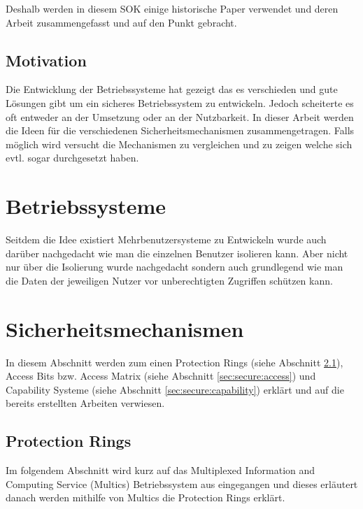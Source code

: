 \documentclass[11pt,technote]{IEEEtran}
\begin{document}
    Deshalb werden in diesem SOK einige historische Paper verwendet und deren Arbeit
    zusammengefasst und auf den Punkt gebracht.
    
    \subsection{Motivation}
      Die Entwicklung der Betriebssysteme hat gezeigt das es verschieden und gute L\"osungen gibt um ein sicheres Betriebssystem zu entwickeln.
      Jedoch scheiterte es oft entweder an der Umsetzung oder an der Nutzbarkeit. 
      In dieser Arbeit werden die Ideen f\"ur die verschiedenen Sicherheitsmechanismen zusammengetragen.
      Falls m\"oglich wird versucht die Mechanismen zu vergleichen und zu zeigen welche sich evtl. sogar durchgesetzt haben.
   \section{Betriebssysteme}
     Seitdem die Idee existiert Mehrbenutzersysteme zu Entwickeln wurde auch dar\"uber nachgedacht wie man die einzelnen Benutzer isolieren kann.
     Aber nicht nur \"uber die Isolierung wurde nachgedacht sondern auch grundlegend wie man die Daten 
     der jeweiligen Nutzer vor unberechtigten Zugriffen sch\"utzen kann.
     
  \section{Sicherheitsmechanismen} \label{sec:secure}
    In diesem Abschnitt werden zum einen Protection Rings (siehe Abschnitt \ref{sec:secure:protectrings}), Access Bits bzw. Access Matrix 
    (siehe Abschnitt \ref{sec:secure:access}) und Capability Systeme (siehe Abschnitt \ref{sec:secure:capability}) erkl\"art und 
    auf die bereits erstellten Arbeiten verwiesen.
    \subsection{Protection Rings} \label{sec:secure:protectrings}
      Im folgendem Abschnitt wird kurz auf das Multiplexed Information and Computing Service (Multics) Betriebssystem
      aus \cite{inproc:multics} eingegangen und dieses erl\"autert danach werden mithilfe von Multics die Protection Rings erkl\"art.
\end{document}
